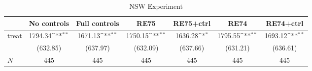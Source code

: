 \begin{table}[htbp]\centering
\def\sym#1{\ifmmode^{#1}\else\(^{#1}\)\fi}
\caption{NSW Experiment}
\begin{tabular}{l*{6}{c}}
\hline\hline
            &\multicolumn{1}{c}{No controls}&\multicolumn{1}{c}{Full controls}&\multicolumn{1}{c}{RE75}&\multicolumn{1}{c}{RE75+ctrl}&\multicolumn{1}{c}{RE74}&\multicolumn{1}{c}{RE74+ctrl}\\
\hline
treat       &     1794.34\sym{**} &     1671.13\sym{**} &     1750.15\sym{**} &     1636.28\sym{*}  &     1795.55\sym{**} &     1693.12\sym{**} \\
            &    (632.85)         &    (637.97)         &    (632.09)         &    (637.66)         &    (631.21)         &    (636.61)         \\
\hline
\(N\)       &         445         &         445         &         445         &         445         &         445         &         445         \\
\hline\hline
\end{tabular}
\end{table}
